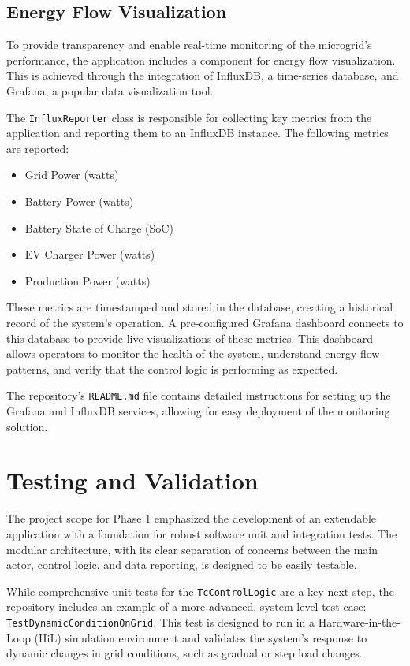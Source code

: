 \documentclass{article}
\begin{document}
\subsection{Energy Flow Visualization}
To provide transparency and enable real-time monitoring of the microgrid's performance, the application includes a component for energy flow visualization. This is achieved through the integration of InfluxDB, a time-series database, and Grafana, a popular data visualization tool.

The \texttt{InfluxReporter} class is responsible for collecting key metrics from the application and reporting them to an InfluxDB instance. The following metrics are reported:
\begin{itemize}
    \item Grid Power (watts)
    \item Battery Power (watts)
    \item Battery State of Charge (SoC)
    \item EV Charger Power (watts)
    \item Production Power (watts)
\end{itemize}

These metrics are timestamped and stored in the database, creating a historical record of the system's operation. A pre-configured Grafana dashboard connects to this database to provide live visualizations of these metrics. This dashboard allows operators to monitor the health of the system, understand energy flow patterns, and verify that the control logic is performing as expected.

The repository's \texttt{README.md} file contains detailed instructions for setting up the Grafana and InfluxDB services, allowing for easy deployment of the monitoring solution.

\section{Testing and Validation}
The project scope for Phase 1 emphasized the development of an extendable application with a foundation for robust software unit and integration tests. The modular architecture, with its clear separation of concerns between the main actor, control logic, and data reporting, is designed to be easily testable.

While comprehensive unit tests for the \texttt{TcControlLogic} are a key next step, the repository includes an example of a more advanced, system-level test case: \texttt{TestDynamicConditionOnGrid}. This test is designed to run in a Hardware-in-the-Loop (HiL) simulation environment and validates the system's response to dynamic changes in grid conditions, such as gradual or step load changes.
\end{document}
